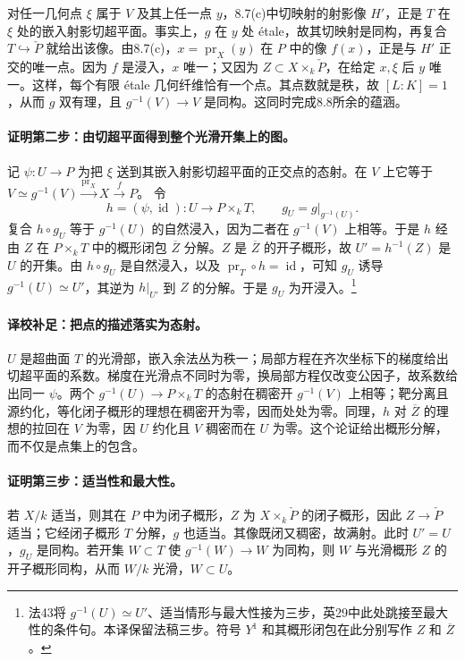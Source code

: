 \documentclass[openany,fontset=fandol]{ctexbook}
\newcommand{\PD}{\check P}
\begin{document}
\newpage
对任一几何点 $\xi$ 属于 $V$ 及其上任一点 $y$，8.7(c)中切映射的射影像 $H'$，正是 $T$ 在 $\xi$ 处的嵌入射影切超平面。事实上，$g$ 在 $y$ 处 étale，故其切映射是同构，再复合 $T\hookrightarrow\PD$ 就给出该像。由8.7(c)，$x=\operatorname{pr}_X(y)$ 在 $P$ 中的像 $f(x)$，正是与 $H'$ 正交的唯一点。因为 $f$ 是浸入，$x$ 唯一；又因为 $Z\subset X\times_k\PD$，在给定 $x,\xi$ 后 $y$ 唯一。这样，每个有限 étale 几何纤维恰有一个点。其点数就是秩，故 $[L:K]=1$，从而 $g$ 双有理，且 $g^{-1}(V)\to V$ 是同构。这同时完成8.8所余的蕴涵。

\paragraph{证明第二步：由切超平面得到整个光滑开集上的图。}
记 $\psi:U\to P$ 为把 $\xi$ 送到其嵌入射影切超平面的正交点的态射。在 $V$ 上它等于
$V\simeq g^{-1}(V)\xrightarrow{\operatorname{pr}_X}X\xrightarrow{f}P$。
令
\[
 h=(\psi,\operatorname{id}):U\longrightarrow P\times_k T,
 \qquad g_U=g|_{g^{-1}(U)}.
\]
复合 $h\circ g_U$ 等于 $g^{-1}(U)$ 的自然浸入，因为二者在 $g^{-1}(V)$ 上相等。于是 $h$ 经由 $Z$ 在 $P\times_k T$ 中的概形闭包 $\overline Z$ 分解。$Z$ 是 $\overline Z$ 的开子概形，故 $U'=h^{-1}(Z)$ 是 $U$ 的开集。由 $h\circ g_U$ 是自然浸入，以及 $\operatorname{pr}_T\circ h=\operatorname{id}$，可知 $g_U$ 诱导 $g^{-1}(U)\simeq U'$，其逆为 $h|_{U'}$ 到 $Z$ 的分解。于是 $g_U$ 为开浸入。\footnote{法43将 $g^{-1}(U)\simeq U'$、适当情形与最大性接为三步，英29中此处跳接至最大性的条件句。本译保留法稿三步。符号 $Y^1$ 和其概形闭包在此分别写作 $Z$ 和 $\overline Z$。}

\paragraph{译校补足：把点的描述落实为态射。}
$U$ 是超曲面 $T$ 的光滑部，嵌入余法丛为秩一；局部方程在齐次坐标下的梯度给出切超平面的系数。梯度在光滑点不同时为零，换局部方程仅改变公因子，故系数给出同一 $\psi$。两个 $g^{-1}(U)\to P\times_k T$ 的态射在稠密开 $g^{-1}(V)$ 上相等；靶分离且源约化，等化闭子概形的理想在稠密开为零，因而处处为零。同理，$h$ 对 $\overline Z$ 的理想的拉回在 $V$ 为零，因 $U$ 约化且 $V$ 稠密而在 $U$ 为零。这个论证给出概形分解，而不仅是点集上的包含。

\paragraph{证明第三步：适当性和最大性。}
若 $X/k$ 适当，则其在 $P$ 中为闭子概形，$Z$ 为 $X\times_k\PD$ 的闭子概形，因此 $Z\to\PD$ 适当；它经闭子概形 $T$ 分解，$g$ 也适当。其像既闭又稠密，故满射。此时 $U'=U$，$g_U$ 是同构。若开集 $W\subset T$ 使 $g^{-1}(W)\to W$ 为同构，则 $W$ 与光滑概形 $Z$ 的开子概形同构，从而 $W/k$ 光滑，$W\subset U$。
\end{document}
